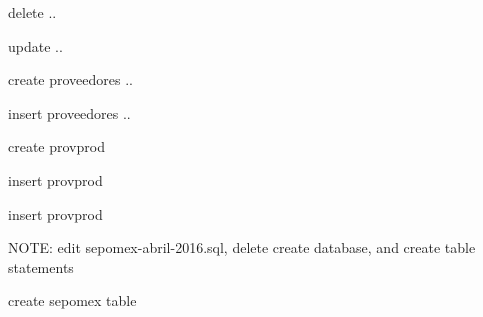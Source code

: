 \documentclass{beamer}
\begin{document}
\begin{frame} 

\begin{block}{delete .. }
  \lstproddelete
\end{block}


\begin{block}{update .. }
  \lstprodupdate
\end{block}


\end{frame}


\begin{frame} 

\begin{block}{create proveedores .. }
 \lstcreateprov
\end{block}


\begin{block}{insert proveedores .. }
  \lstinsertprov
\end{block}


\end{frame}



\begin{frame} 

\begin{block}{create provprod}
 \lstcreateprodprov
\end{block}

\end{frame}



\begin{frame} 

\begin{block}{insert provprod}
 \lstinsertprodprov
\end{block}

\end{frame}



\begin{frame} 

\begin{block}{insert provprod}
 \lstsepomex
\end{block}

\end{frame}


\begin{frame} 

NOTE: edit sepomex-abril-2016.sql, delete create database, and create table statements

\begin{block}{create sepomex table}
 \lstcreatesepomex
\end{block}

\end{frame}
\end{document}
